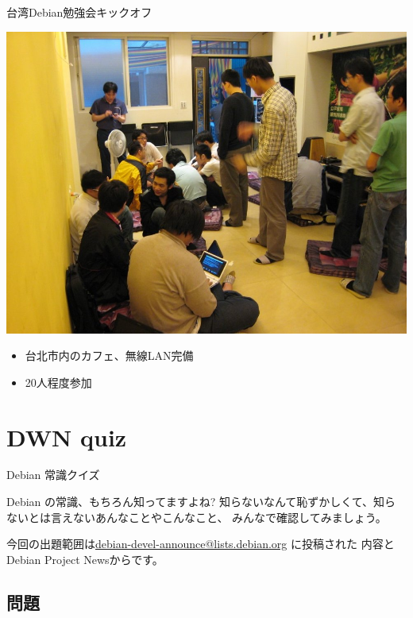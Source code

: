 \documentclass[cjk,dvipdfmx,12pt]{beamer}
\begin{document}
\begin{frame}{台湾Debian勉強会キックオフ}
\begin{minipage}[t]{0.45\hsize}
\includegraphics[width=0.9\hsize]{image200805/taipeidebian.jpg}
\end{minipage}
\begin{minipage}[t]{0.45\hsize}
\begin{itemize}
 \item 台北市内のカフェ、無線LAN完備
 \item 20人程度参加
\end{itemize}
\end{minipage}
\end{frame}



\section{DWN quiz}
\begin{frame}{Debian 常識クイズ}

Debian の常識、もちろん知ってますよね?
知らないなんて恥ずかしくて、知らないとは言えないあんなことやこんなこと、
みんなで確認してみましょう。

今回の出題範囲は\url{debian-devel-announce@lists.debian.org} に投稿された
内容とDebian Project Newsからです。

\end{frame}

\subsection{問題}

\end{document}
